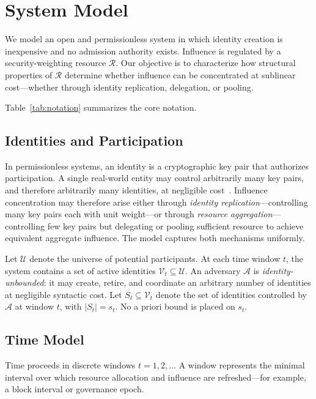 \documentclass[10pt,journal,compsoc]{IEEEtran}
\theoremstyle{remark}
\begin{document}
	\section{System Model}
	\label{sec:model}
	
	We model an open and permissionless system in which
	identity creation is inexpensive and no admission
	authority exists.
	Influence is regulated by a security-weighting resource
	$\mathcal{R}$.
	Our objective is to characterize how structural properties
	of $\mathcal{R}$ determine whether influence can be
	concentrated at sublinear cost---whether through identity
	replication, delegation, or pooling.
	
	Table~\ref{tab:notation} summarizes the core notation.
	
	\subsection{Identities and Participation}
	\label{ssec:identity}
	
	In permissionless systems, an identity is a cryptographic
	key pair that authorizes participation.
	A single real-world entity may control arbitrarily many
	key pairs, and therefore arbitrarily many identities,
	at negligible cost~\cite{douceur2002sybil}.
	Influence concentration may therefore arise either through
	\emph{identity replication}---controlling many key pairs
	each with unit weight---or through \emph{resource
		aggregation}---controlling few key pairs but delegating
	or pooling sufficient resource to achieve equivalent
	aggregate influence.
	The model captures both mechanisms uniformly.
	
	Let $\mathcal{U}$ denote the universe of potential
	participants.
	At each time window $t$, the system contains a set of
	active identities $\mathcal{V}_t \subseteq \mathcal{U}$.
	An adversary $\mathcal{A}$ is \emph{identity-unbounded}:
	it may create, retire, and coordinate an arbitrary
	number of identities at negligible syntactic cost.
	Let $S_t \subseteq \mathcal{V}_t$ denote the set of
	identities controlled by $\mathcal{A}$ at window $t$,
	with $|S_t| = s_t$.
	No a priori bound is placed on $s_t$.
	
	\subsection{Time Model}
	\label{ssec:time}
	
	Time proceeds in discrete windows $t = 1, 2, \ldots$
	A window represents the minimal interval over which
	resource allocation and influence are refreshed---for
	example, a block interval or governance epoch.
	
\end{document}
